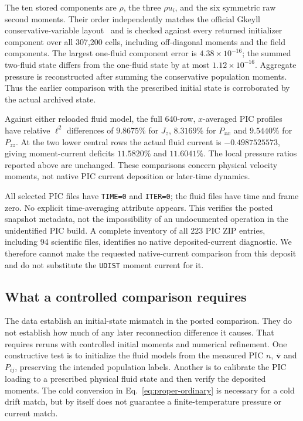 The ten stored components are $\rho$, the three $\rho u_i$, and the six
symmetric raw second moments. Their order independently matches the official
Gkeyll conservative-variable layout~\cite{gkeylllayout} and is checked against every returned
initializer component over all 307,200 cells, including off-diagonal moments
and the field components. The largest one-fluid component error is
$4.38\times10^{-16}$; the summed two-fluid state differs from the one-fluid
state by at most $1.12\times10^{-16}$. Aggregate pressure is reconstructed
after summing the conservative population moments. Thus the earlier
comparison with the prescribed initial state is corroborated by the actual
archived state.

Against either reloaded fluid model, the full 640-row, $x$-averaged PIC
profiles have relative $\ell^2$ differences of $9.8675\%$ for $J_z$,
$8.3169\%$ for $P_{xx}$ and $9.5440\%$ for $P_{zz}$. At the two lower central
rows the actual fluid current is $-0.4987525573$, giving moment-current
deficits $11.5820\%$ and $11.6041\%$. The local pressure ratios reported
above are unchanged. These comparisons concern physical velocity moments,
not native PIC current deposition or later-time dynamics.

All selected PIC files have \texttt{TIME=0} and \texttt{ITER=0}; the fluid
files have time and frame zero. No explicit time-averaging attribute appears.
This verifies the posted snapshot metadata, not the impossibility of an
undocumented operation in the unidentified PIC build. A complete inventory
of all 223 PIC ZIP entries, including 94 scientific files, identifies no
native deposited-current diagnostic. We therefore cannot make the requested
native-current comparison from this deposit and do not substitute the
\texttt{UDIST} moment current for it.

\subsection{What a controlled comparison requires}
The data establish an initial-state mismatch in the posted comparison. They
do not establish how much of any later reconnection difference it causes.
That requires reruns with controlled initial moments and numerical refinement.
One constructive test is to initialize the fluid models from the measured
PIC $n$, $\overline{\mathbf v}$ and $P_{ij}$, preserving the intended population
labels. Another is to calibrate the PIC loading to a prescribed physical
fluid state and then verify the deposited moments. The cold conversion in
Eq.~\eqref{eq:proper-ordinary} is necessary for a cold drift match, but by
itself does not guarantee a finite-temperature pressure or current match.

